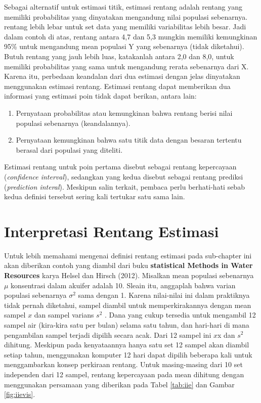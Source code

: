 \documentclass[]{book}
\providecommand{\tightlist}{%
  \setlength{\itemsep}{0pt}\setlength{\parskip}{0pt}}
\begin{document}
Sebagai alternatif untuk estimasi titik, estimasi rentang adalah rentang
yang memiliki probabilitas yang dinyatakan mengandung nilai populasi
sebenarnya. rentang lebih lebar untuk set data yang memiliki
variabilitas lebih besar. Jadi dalam contoh di atas, rentang antara 4,7
dan 5,3 mungkin memiliki kemungkinan 95\% untuk mengandung mean populasi
Y yang sebenarnya (tidak diketahui). Butuh rentang yang jauh lebih luas,
katakanlah antara 2,0 dan 8,0, untuk memiliki probabilitas yang sama
untuk mengandung rerata sebenarnya dari X. Karena itu, perbedaan
keandalan dari dua estimasi dengan jelas dinyatakan menggunakan estimasi
rentang. Estimasi rentang dapat memberikan dua informasi yang estimasi
poin tidak dapat berikan, antara lain:

\begin{enumerate}
\def\labelenumi{\arabic{enumi}.}
\tightlist
\item
  Pernyataan probabilitas atau kemungkinan bahwa rentang berisi nilai
  populasi sebenarnya (keandalannya).
\item
  Pernyataan kemungkinan bahwa satu titik data dengan besaran tertentu
  berasal dari populasi yang diteliti.
\end{enumerate}

Estimasi rentang untuk poin pertama disebut sebagai rentang kepercayaan
(\emph{confidence interval}), sedangkan yang kedua disebut sebagai
rentang prediksi (\emph{prediction interal}). Meskipun salin terkait,
pembaca perlu berhati-hati sebab kedua definisi tersebut sering kali
tertukar satu sama lain.

\section{Interpretasi Rentang
Estimasi}\label{interpretasi-rentang-estimasi}

Untuk lebih memahami mengenai definisi rentang estimasi pada sub-chapter
ini akan diberikan contoh yang diambil dari buku \textbf{statistical
Methods in Water Resources} karya Helsel dan Hirsch (2012). Misalkan
mean populasi sebenarnya \(\mu\) konsentrasi dalam akuifer adalah 10.
Sleain itu, anggaplah bahwa varian populasi sebenarnya \(\sigma^2\) sama
dengan 1. Karena nilai-nilai ini dalam praktiknya tidak pernah
diketahui, sampel diambil untuk memperkirakannya dengan mean sampel
\(x\) dan sampel varians \(s^2\) . Dana yang cukup tersedia untuk
mengambil 12 sampel air (kira-kira satu per bulan) selama satu tahun,
dan hari-hari di mana pengambilan sampel terjadi dipilih secara acak.
Dari 12 sampel ini \(x\)x dan \(s^2\) dihitung. Meskipun pada
kenyataannya hanya satu set 12 sampel akan diambil setiap tahun,
menggunakan komputer 12 hari dapat dipilih beberapa kali untuk
menggambarkan konsep perkiraan rentang. Untuk masing-masing dari 10 set
independen dari 12 sampel, rentang kepercayaan pada mean dihitung dengan
menggunakan persamaan yang diberikan pada Tabel \ref{tab:iie} dan Gambar
\ref{fig:iievis}.
\end{document}
